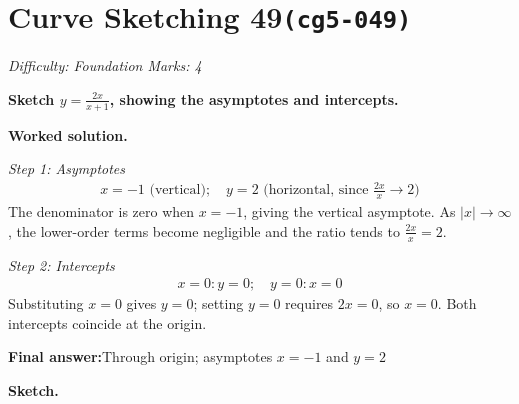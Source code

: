 \documentclass[11pt]{article}
\newcommand{\question}[1]{\par\medskip\noindent\textbf{#1}\par}
\begin{document}
\section*{Curve Sketching 49\quad\small\texttt{(cg5-049)}}
\textit{Difficulty: Foundation \quad\textbar\quad Marks: 4}

\question{Sketch \( y = \frac{2x}{x+1} \), showing the asymptotes and intercepts.}

\textbf{Worked solution.}

\textit{Step 1: Asymptotes}
\[\begin{gathered}
x = -1 \text{ (vertical)}; \quad y = 2 \text{ (horizontal, since } \frac{2x}{x} \to 2)
\end{gathered}\]
The denominator is zero when \( x = -1 \), giving the vertical asymptote. As \( |x| \to \infty \), the lower-order terms become negligible and the ratio tends to \( \tfrac{2x}{x} = 2 \).

\textit{Step 2: Intercepts}
\[\begin{gathered}
x = 0: y = 0; \quad y = 0: x = 0
\end{gathered}\]
Substituting \( x = 0 \) gives \( y = 0 \); setting \( y = 0 \) requires \( 2x = 0 \), so \( x = 0 \). Both intercepts coincide at the origin.

\begin{answerbox}
\textbf{Final answer:}\quad Through origin; asymptotes \(\displaystyle x = -1\) and \(\displaystyle y = 2\)
\end{answerbox}
\textbf{Sketch.}
\end{document}
